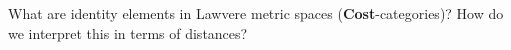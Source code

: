 What are identity elements in Lawvere metric spaces (\textbf{Cost}-categories)? How do we interpret this in terms of distances?